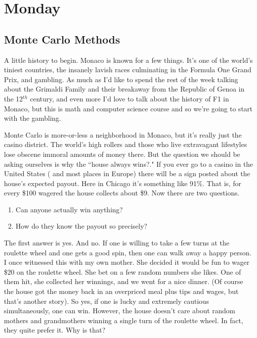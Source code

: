 \documentclass{article}
\theoremstyle{definition}
\theoremstyle{remark}
\begin{document}
\section{Monday}
\subsection{Monte Carlo Methods}

A little history to begin.  Monaco is known for a few things. It's one of the world's tiniest countries, the insanely lavish races culminating in the Formula One Grand Prix, and gambling.  As much as I'd like to spend the rest of the week talking about the Grimaldi Family and their breakaway from the Republic of Genoa in the 12$^{th}$ century, and even more I'd love to talk about the history of F1 in Monaco, but this is math and computer science course and so we're going to start with the gambling.  

Monte Carlo is more-or-less a neighborhood in Monaco, but it's really just the casino district.  The world's high rollers and those who live extravagant lifestyles lose obscene immoral amounts of money there.  But the question we should be asking ourselves is why the ``house always wins?."  If you ever go to a casino in the United States ( and most places in Europe) there will be a sign posted about the house's expected payout.  Here in Chicago it's something like 91\%.  That is, for every \$100 wagered the house collects about \$9.  Now there are two questions.
\begin{enumerate}
	\item Can anyone actually win anything?
	\item How do they know the payout so precisely?
\end{enumerate}

The first answer is yes.  And no.  If one is willing to take a few turns at the roulette wheel and one gets a good spin, then one can walk away a happy person.  I once witnessed this with my own mother.  She decided it would be fun to wager \$20 on the roulette wheel.  She bet on a few random numbers she likes.  One of them hit, she collected her winnings, and we went for a nice dinner. (Of course the house got the money back in an overpriced meal plus tips and wages, but that's another story).  So yes, if one is lucky and extremely cautious simultaneously, one can win. However, the house doesn't care about random mothers and grandmothers winning a single turn of the roulette wheel.  In fact, they quite prefer it.  Why is that?
\end{document}
